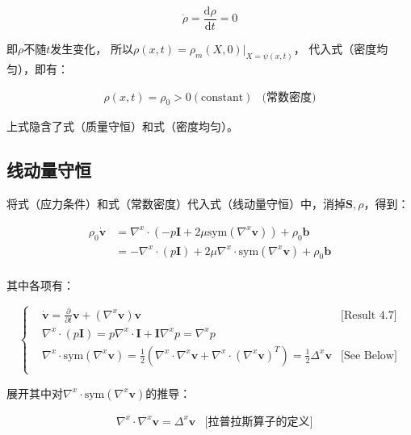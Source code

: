 \documentclass[lang=cn, a4paper,chinesefont=founder,bibend=bibtex]{elegantpaper}
\begin{document}
\[
\dot{\rho} = \frac{\mathrm{d}\rho}{\mathrm{d}t} = 0
\]

即$\rho$不随$t$发生变化，
所以$\rho(x, t) = \rho_m(X, 0)|_{X=\psi(x, t)}$，
代入式（密度均匀），即有：

$$
\begin{aligned}
\rho(x, t) = \rho_0 > 0 (\text{constant}) & \text{(常数密度)}
\end{aligned}
$$

上式隐含了式（质量守恒）和式（密度均匀）。

\subsection{线动量守恒}
将式（应力条件）和式（常数密度）代入式（线动量守恒）中，消掉$\bm{S}, \rho$，得到：

\begin{equation}
	\begin{aligned}
		\rho_0\dot{\bm{v}} 
		&= \nabla^x\cdot (-p\bm{I}+2\mu \mathrm{sym}(\nabla^x\bm{v})) + \rho_0 \bm{b} \\
		&= -\nabla^x\cdot (p\bm{I}) + 2\mu \nabla^x \cdot \mathrm{sym}(\nabla^x\bm{v}) + \rho_0 \bm{b} \\
	\end{aligned}
	\tag{1}
\end{equation}

其中各项有：

$$
\left\{
\begin{aligned}
& \dot{\bm{v}} = \frac{\partial}{\partial t} \bm{v} + (\nabla^x \bm{v}) \bm{v} & \text{[Result 4.7]} \\
& \nabla^x\cdot(p\bm{I}) = p\nabla^x\cdot\bm{I} + \bm{I}\nabla^xp = \nabla^xp & \\
& \nabla^x\cdot\mathrm{sym}(\nabla^x\bm{v}) = \frac{1}{2} ( \nabla^x \cdot \nabla^x\bm{v} + \nabla^x \cdot (\nabla^x\bm{v})^T) = \frac{1}{2} \Delta^x\bm{v} & \text{[See Below]}\\
\end{aligned}
\right.
$$

展开其中对$\nabla^x\cdot\mathrm{sym}(\nabla^x\bm{v})$的推导：

$$
\begin{aligned}
& \nabla^x \cdot \nabla^x \bm{v} = \Delta^x \bm{v} & \text{[拉普拉斯算子的定义]} \\
\end{aligned}
$$
\end{document}
